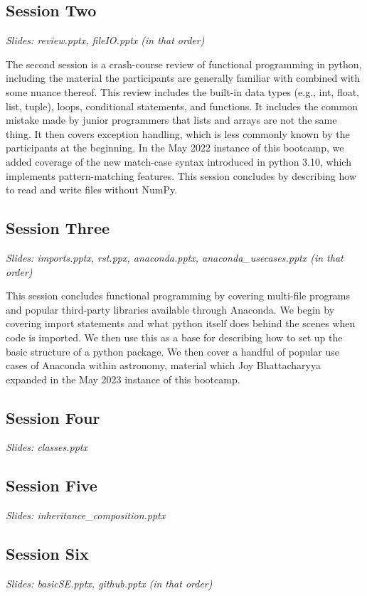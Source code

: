 \subsection{Session Two}
\label{sec:curriculum:two}
\noindent
\textit{Slides: review.pptx, fileIO.pptx (in that order)}
\par\noindent
The second session is a crash-course review of functional programming in
python, including the material the participants are generally familiar with
combined with some nuance thereof.
This review includes the built-in data types (e.g., int, float, list, tuple),
loops, conditional statements, and functions.
It includes the common mistake made by junior programmers that lists and arrays
are not the same thing.
It then covers exception handling, which is less commonly known by the
participants at the beginning.
In the May 2022 instance of this bootcamp, we added coverage of the new
match-case syntax introduced in python 3.10, which implements pattern-matching
features.
This session concludes by describing how to read and write files without NumPy.

\subsection{Session Three}
\label{sec:curriculum:three}
\noindent
\textit{Slides: imports.pptx, rst.ppx, anaconda.pptx, anaconda\_usecases.pptx
(in that order)}
\par\noindent
This session concludes functional programming by covering multi-file programs
and popular third-party libraries available through Anaconda.
We begin by covering import statements and what python itself does behind the
scenes when code is imported.
We then use this as a base for describing how to set up the basic structure of
a python package.
We then cover a handful of popular use cases of Anaconda within astronomy,
material which Joy Bhattacharyya expanded in the May 2023 instance of this
bootcamp.

\subsection{Session Four}
\label{sec:curriculum:four}
\noindent
\textit{Slides: classes.pptx}
\par\noindent

\subsection{Session Five}
\label{sec:curriculum:five}
\noindent
\textit{Slides: inheritance\_composition.pptx}
\par\noindent

\subsection{Session Six}
\label{sec:curriculum:six}
\noindent
\textit{Slides: basicSE.pptx, github.pptx (in that order)}
\par\noindent

